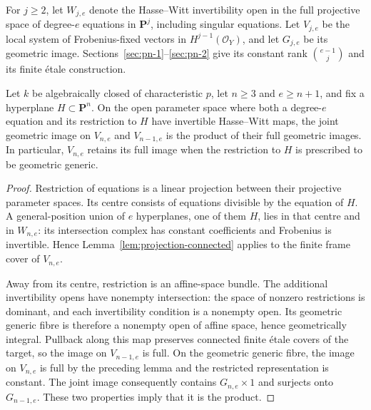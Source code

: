 For $j\ge2$, let $W_{j,e}$ denote the Hasse--Witt invertibility open in the full projective space of degree-$e$ equations in $\mathbf P^j$, including singular equations. Let $V_{j,e}$ be the local system of Frobenius-fixed vectors in $H^{j-1}(\mathcal O_Y)$, and let $G_{j,e}$ be its geometric image. Sections~\ref{sec:pn-1}--\ref{sec:pn-2} give its constant rank $\binom{e-1}{j}$ and its finite \textup{\'etale} construction.

\begin{proposition}\label{prop:restriction-product}
Let $k$ be algebraically closed of characteristic $p$, let $n\ge3$ and $e\ge n+1$, and fix a hyperplane $H\subset\mathbf P^n$. On the open parameter space where both a degree-$e$ equation and its restriction to $H$ have invertible Hasse--Witt maps, the joint geometric image on $V_{n,e}$ and $V_{n-1,e}$ is the product of their full geometric images. In particular, $V_{n,e}$ retains its full image when the restriction to $H$ is prescribed to be geometric generic.
\end{proposition}
\begin{proof}
Restriction of equations is a linear projection between their projective parameter spaces. Its centre consists of equations divisible by the equation of $H$. A general-position union of $e$ hyperplanes, one of them $H$, lies in that centre and in $W_{n,e}$: its intersection complex has constant coefficients and Frobenius is invertible. Hence Lemma~\ref{lem:projection-connected} applies to the finite frame cover of $V_{n,e}$.

Away from its centre, restriction is an affine-space bundle. The additional invertibility opens have nonempty intersection: the space of nonzero restrictions is dominant, and each invertibility condition is a nonempty open. Its geometric generic fibre is therefore a nonempty open of affine space, hence geometrically integral. Pullback along this map preserves connected finite \textup{\'etale} covers of the target, so the image on $V_{n-1,e}$ is full. On the geometric generic fibre, the image on $V_{n,e}$ is full by the preceding lemma and the restricted representation is constant. The joint image consequently contains $G_{n,e}\times1$ and surjects onto $G_{n-1,e}$. These two properties imply that it is the product.
\end{proof}

